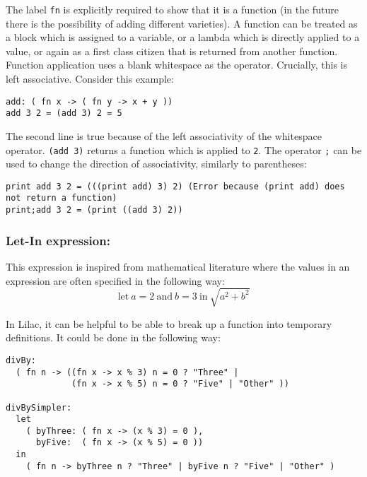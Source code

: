 \documentclass[a4paper, 11pt]{report}
\begin{document}
The label \verb|fn| is explicitly required to show that it is a function (in the future there is the possibility of adding different varieties). A function can be treated as a block which is assigned to a variable, or a lambda which is directly applied to a value, or again as a first class citizen that is returned from another function. Function application uses a blank whitespace as the operator. Crucially, this is left associative. Consider this example:
\begin{verbatim}
add: ( fn x -> ( fn y -> x + y ))
add 3 2 = (add 3) 2 = 5
\end{verbatim}

The second line is true because of the left associativity of the whitespace operator. \verb|(add 3)| returns a function which is applied to \verb|2|. The operator \verb|;| can be used to change the direction of associativity, similarly to parentheses:\\
\begin{verbatim}
print add 3 2 = (((print add) 3) 2) (Error because (print add) does not return a function)
print;add 3 2 = (print ((add 3) 2))
\end{verbatim}

\subsubsection{Let-In expression:}
This expression is inspired from mathematical literature where the values in an expression are often specified in the following way:\\

\[ \text{let}\ a=2\ \text{and}\ b=3\ \text{in}\ \sqrt{a^2+b^2} \]

In Lilac, it can be helpful to be able to break up a function into temporary definitions. It could be done in the following way:\\
\begin{verbatim}
divBy:
  ( fn n -> ((fn x -> x % 3) n = 0 ? "Three" | 
             (fn x -> x % 5) n = 0 ? "Five" | "Other" ))

divBySimpler:
  let 
    ( byThree: ( fn x -> (x % 3) = 0 ),
      byFive:  ( fn x -> (x % 5) = 0 ))
  in
    ( fn n -> byThree n ? "Three" | byFive n ? "Five" | "Other" )
\end{verbatim}
\end{document}
